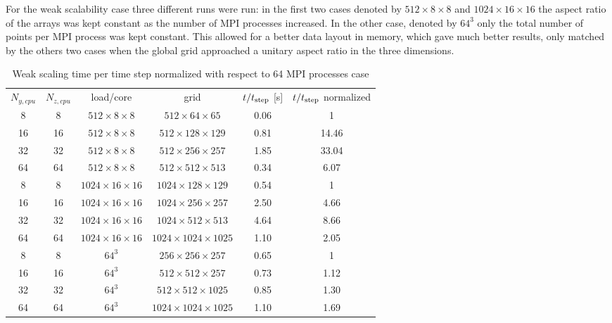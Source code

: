 For the weak scalability case three different runs were run: in the first two cases denoted by $512\times8\times8$ and $1024\times16\times16$ the aspect ratio of the arrays was kept constant as the number of MPI processes increased. In the other case, denoted by $64^3$ only the total number of points per MPI process was kept constant. This allowed for a better data layout in memory, which gave much better results, only matched by the others two cases when the global grid approached a unitary aspect ratio in the three dimensions.
\begin{table}[H]
\centering
\caption{Weak scaling time per time step normalized with respect to 64 MPI processes case}
\begin{tabular}{c|c|c|c|c|c}
$N_{y,cpu}$ & $N_{z,cpu}$& load/core & grid & $t/t_{\textnormal{step}}$ [s] &$t/t_{\textnormal{step}}$ normalized\\[1.5ex]
8& 8 & $512\times8\times8$  &$512\times64\times65$ &  0.06 & 1\\
16 &16&$512\times8\times8$  & $512\times128\times129$& 0.81 & 14.46\\
32 &32&$512\times8\times8$  & $512\times256\times257$& 1.85 & 33.04\\
64 &64 &$512\times8\times8$  &$512\times512\times513$ & 0.34 & 6.07 \\
\hline
8& 8&$1024\times16\times16$  & $1024\times128\times129$ &0.54 &1 \\
16& 16& $1024\times16\times16$  & $1024\times256\times257$ &2.50 & 4.66\\
32 &32 &$1024\times16\times16$  & $1024\times512\times513$ &4.64 & 8.66\\
64 &64 &$1024\times16\times16$  & $1024\times1024\times1025$ &1.10 & 2.05\\
\hline
8& 8 & $64^3$& $256\times256\times257$ & 0.65& 1\\
16& 16&$64^3$&$512\times512\times257$ & 0.73 &1.12 \\
32& 32 &$64^3$&$512\times512\times1025$ &0.85 & 1.30 \\
64& 64 &$64^3$&$1024\times1024\times1025$ &1.10 &1.69 \\ 
\end{tabular}
\end{table}








